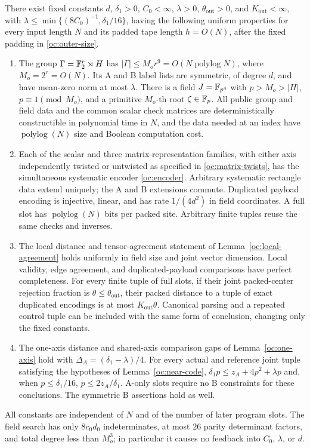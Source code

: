 \begin{theorem}\label{thm:outer-codes}
There exist fixed constants $d$, $\delta_1>0$, $C_0<\infty$,
$\lambda>0$, $\theta_{\mathrm{out}}>0$, and $K_{\mathrm{out}}<\infty$, with
$\lambda\le\min\{(8C_0)^{-1},\delta_1/16\}$, having the following
uniform properties for every input length $N$ and its padded tape
length $h=O(N)$, after the fixed padding in \eqref{oc:outer-size}.
\begin{enumerate}[label=(\roman*)]
\item The group $\Gamma=\mathbb{F}_2^r\rtimes H$ has
$|\Gamma|\le M_or^9=O(N\operatorname{polylog} N)$, where $M_o=2^r=O(N)$.
Its A and B label lists are symmetric, of degree $d$, and have
mean-zero norm at most $\lambda$.  There is a field
$J=\mathbb{F}_{p^4}$ with $p>M_o>|H|$, $p\equiv1\pmod{M_o}$, and a
primitive $M_o$-th root $\zeta\in\mathbb{F}_p$.  All public group and field
data and the common scalar check matrices are deterministically
constructible in polynomial time in $N$, and the data needed at an
index have $\operatorname{polylog}(N)$ size and Boolean computation cost.
\item Each of the scalar and three matrix-representation families,
with either axis independently twisted or untwisted as specified
in \eqref{oc:matrix-twists}, has the simultaneous systematic
encoder \eqref{oc:encoder}.  Arbitrary systematic rectangle data
extend uniquely; the A and B extensions commute.  Duplicated payload
encoding is injective, linear, and has rate $1/(4d^2)$ in field
coordinates.  A full slot has $\operatorname{polylog}(N)$ bits per packed site.
Arbitrary finite tuples reuse the same checks and inverses.
\item The local distance and tensor-agreement statement of
Lemma~\ref{oc:local-agreement} holds uniformly in field size and
joint vector dimension.  Local validity, edge agreement, and
duplicated-payload comparisons have perfect completeness.  For
every finite tuple of full slots, if their joint packed-center
rejection fraction is $\theta\le\theta_{\mathrm{out}}$, their packed
distance to a tuple of exact duplicated encodings is at most
$K_{\mathrm{out}}\theta$.  Canonical parsing and a repeated control
tuple can be included with the same form of conclusion, changing
only the fixed constants.
\item The one-axis distance and shared-axis comparison gaps of
Lemma~\ref{oc:one-axis} hold with $\Delta_A=(\delta_1-\lambda)/4$.
For every actual and reference joint tuple satisfying the hypotheses
of Lemma~\ref{oc:near-code},
$\delta_1p\le z_A+4p^2+\lambda p$ and, when
$p\le\delta_1/16$, $p\le2z_A/\delta_1$.  A-only slots require
no B constraints for these conclusions.  The symmetric B assertions
hold as well.
\end{enumerate}
All constants are independent of $N$ and of the number of later
program slots.  The field search has only $8c_0d_0$ indeterminates,
at most $26$ parity determinant factors, and total degree less than
$M_o^3$; in particular it causes no feedback into $C_0$, $\lambda$,
or $d$.
\end{theorem}

